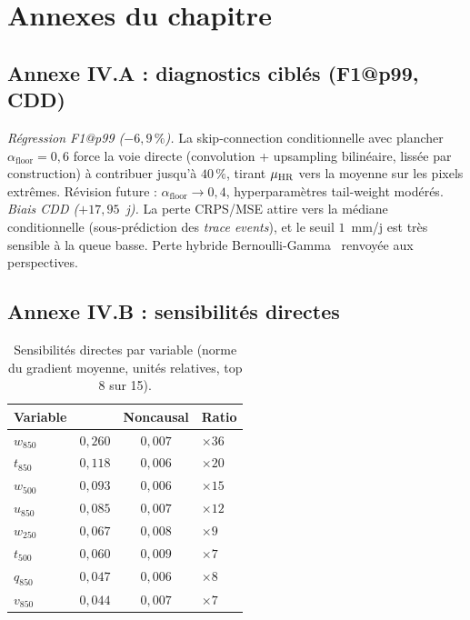 \section*{Annexes du chapitre}

\subsection*{Annexe IV.A : diagnostics ciblés (F1@p99, CDD)}
\label{ssec:exp-annexe-diags}

\emph{Régression F1@p99 ($-6{,}9\,\%$).} La skip-connection conditionnelle avec plancher $\alpha_{\mathrm{floor}}=0{,}6$ force la voie directe (convolution + upsampling bilinéaire, lissée par construction) à contribuer jusqu'à $40\,\%$, tirant $\mu_{\text{HR}}$ vers la moyenne \LR{} sur les pixels extrêmes. Révision future : $\alpha_{\mathrm{floor}}\to 0{,}4$, hyperparamètres tail-weight modérés. \emph{Biais CDD ($+17{,}95$~j).} La perte CRPS/MSE attire vers la médiane conditionnelle (sous-prédiction des \emph{trace events}), et le seuil $1$~mm/j est très sensible à la queue basse. Perte hybride Bernoulli-Gamma~\cite{maraun_widmann_2018} renvoyée aux perspectives.

\subsection*{Annexe IV.B : sensibilités directes}
\label{ssec:exp-annexe-sens}

\begin{table}[ht]
  \centering
  \small
  \caption[Sensibilités directes par variable]{Sensibilités directes par variable \LR{} (norme du gradient moyenne, unités relatives, top 8 sur 15).}
  \label{tab:exp-res-sens}
  \begin{tabularx}{\linewidth}{l c c X}
    \toprule
    \textbf{Variable} & \Oracle{} & \textbf{Noncausal} & \textbf{Ratio} \\
    \midrule
    $w_{850}$ & $0{,}260$ & $0{,}007$ & $\times 36$ \\
    $t_{850}$ & $0{,}118$ & $0{,}006$ & $\times 20$ \\
    $w_{500}$ & $0{,}093$ & $0{,}006$ & $\times 15$ \\
    $u_{850}$ & $0{,}085$ & $0{,}007$ & $\times 12$ \\
    $w_{250}$ & $0{,}067$ & $0{,}008$ & $\times 9$ \\
    $t_{500}$ & $0{,}060$ & $0{,}009$ & $\times 7$ \\
    $q_{850}$ & $0{,}047$ & $0{,}006$ & $\times 8$ \\
    $v_{850}$ & $0{,}044$ & $0{,}007$ & $\times 7$ \\
    \bottomrule
  \end{tabularx}
\end{table}

